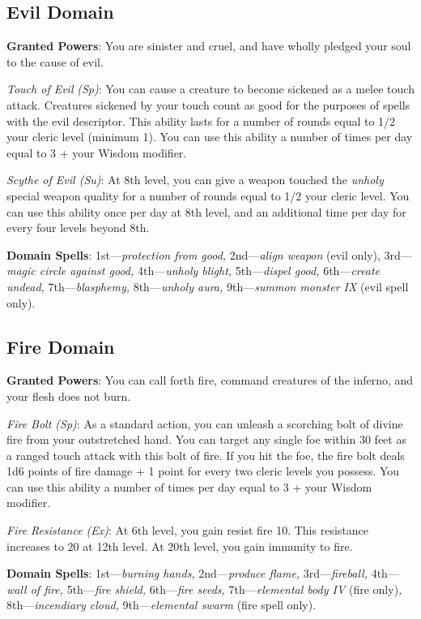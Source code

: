 \subsection{Evil Domain}

				
\textbf{Granted Powers}: You are sinister and cruel, and have wholly pledged your soul to the cause of evil.
				
\textit{Touch of Evil} \textit{(Sp)}: You can cause a creature to become sickened as a melee touch attack. Creatures sickened by your touch count as good for the purposes of spells with the evil descriptor. This ability lasts for a number of rounds equal to 1/2 your cleric level (minimum 1). You can use this ability a number of times per day equal to 3 + your Wisdom modifier.
				
\textit{Scythe of Evil (Su)}: At 8th level, you can give a weapon touched the\textit{ unholy }special weapon quality for a number of rounds equal to 1/2 your cleric level. You can use this ability once per day at 8th level, and an additional time per day for every four levels beyond 8th.
				
\textbf{Domain Spells}: 1st---\textit{protection from good, }2nd---\textit{align weapon }(evil only), 3rd---\textit{magic circle against good, }4th---\textit{unholy blight, }5th---\textit{dispel good, }6th---\textit{create undead, }7th---\textit{blasphemy, }8th---\textit{unholy aura, }9th---\textit{summon monster IX} (evil spell only). 
				
\subsection{Fire Domain}

				
\textbf{Granted Powers}: You can call forth fire, command creatures of the inferno, and your flesh does not burn.
				
\textit{Fire Bolt (Sp)}: As a standard action, you can unleash a scorching bolt of divine fire from your outstretched hand. You can target any single foe within 30 feet as a ranged touch attack with this bolt of fire. If you hit the foe, the fire bolt deals 1d6 points of fire damage + 1 point for every two cleric levels you possess. You can use this ability a number of times per day equal to 3 + your Wisdom modifier. 
				
\textit{Fire Resistance (Ex)}: At 6th level, you gain resist fire 10. This resistance increases to 20 at 12th level. At 20th level, you gain immunity to fire.
				
\textbf{Domain Spells}: 1st---\textit{burning hands, }2nd---\textit{produce flame, }3rd---\textit{fireball, }4th---\textit{wall of fire, }5th---\textit{fire shield, }6th---\textit{fire seeds, }7th---\textit{elemental body IV }(fire only)\textit{, }8th---\textit{incendiary cloud, }9th---\textit{elemental swarm }(fire spell only).
				
